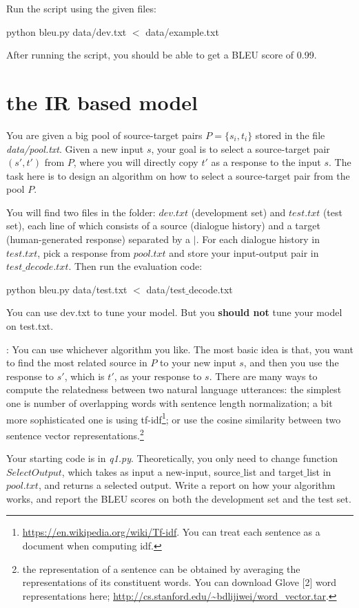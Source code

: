 \documentclass{article}
\begin{document}
Run the script using the given files:
\begin{center}
python bleu.py data/dev.txt  $<$ data/example.txt
\end{center}

After running the script, you should be able to get a BLEU score of 0.99. 
\section{the IR based model}
You are given a big pool of source-target pairs $P=\{s_i, t_i\}$ stored in the file {\it data/pool.txt}. 
Given a new input $s$, your goal is to select a source-target pair $(s',t')$ from $P$, where you will directly copy $t'$ as a response to the input $s$.
The task here is to design an algorithm on how to select  a source-target pair from the pool $P$. 

You will find two files in the folder: $dev.txt$ (development set) and $test.txt$ (test set), each line of which consists of a source (dialogue history) and a target (human-generated response)
separated by a $|$.
For each dialogue history in $test.txt$, pick a response from $pool.txt$ and store your input-output pair in $test\_decode.txt$.
Then run the evaluation code: 
\begin{center}
python bleu.py data/test.txt $<$ data/test$\_$decode.txt 
\end{center}
You can use dev.txt to tune your model. But you {\bf should not} tune your model on test.txt. 

: You can use whichever algorithm you like. The most basic idea is that, you want to find the most related source in $P$ to your new input $s$, and then you use the response to $s'$, which is $t'$, as your response to $s$. There are many ways to compute the relatedness between two natural language utterances: the simplest one is number of overlapping words with sentence length normalization; a bit more sophisticated one is using tf-idf\footnote{\url{https://en.wikipedia.org/wiki/Tf-idf}. You can treat each sentence as a document when computing idf.}; or use the cosine similarity between two sentence vector representations.\footnote{the representation of a sentence can be obtained by averaging the representations of its constituent words. You can download Glove [2] word representations here; \url{http://cs.stanford.edu/~bdlijiwei/word_vector.tar}. }


Your starting code is in {\it q1.py}. Theoretically, you only need to change function $SelectOutput$, which takes as input a new-input, source$\_$list and target$\_$list in $pool.txt$, and returns a selected output.
Write a report on how your algorithm works, and report the BLEU scores on both the development set and the test set. 
\end{document}
